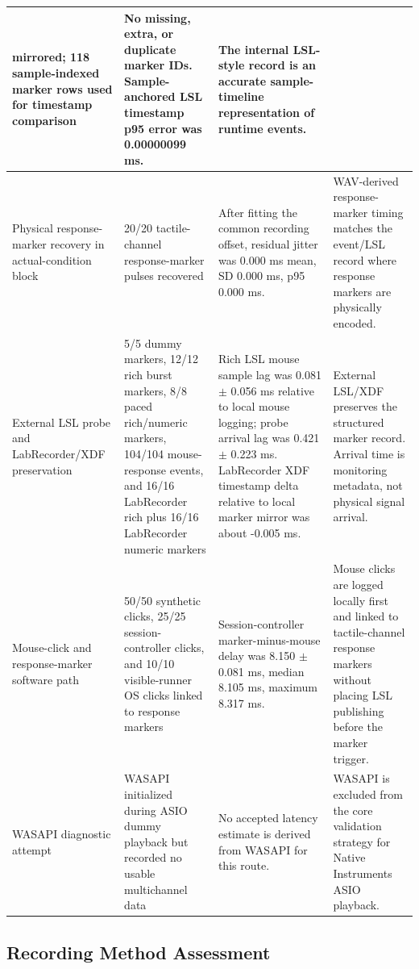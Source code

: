 \documentclass[11pt]{article}
\begin{document}
\begin{longtable}{|p{}|p{}|p{}|p{}|}
mirrored; 118 sample-indexed marker rows used for timestamp comparison & No
missing, extra, or duplicate marker IDs. Sample-anchored LSL timestamp p95 error
was 0.00000099 ms. & The internal LSL-style record is an accurate
sample-timeline representation of runtime events. \\
\hline
Physical response-marker recovery in actual-condition block & 20/20
tactile-channel response-marker pulses recovered & After fitting the common
recording offset, residual jitter was 0.000 ms mean, SD 0.000 ms, p95
0.000 ms. & WAV-derived response-marker timing matches the event/LSL record
where response markers are physically encoded. \\
\hline
External LSL probe and LabRecorder/XDF preservation & 5/5 dummy markers, 12/12
rich burst markers, 8/8 paced rich/numeric markers, 104/104 mouse-response
events, and 16/16 LabRecorder rich plus 16/16 LabRecorder numeric markers &
Rich LSL mouse sample lag was 0.081 $\pm$ 0.056 ms relative to local mouse
logging; probe arrival lag was 0.421 $\pm$ 0.223 ms. LabRecorder XDF timestamp
delta relative to local marker mirror was about -0.005 ms. & External LSL/XDF
preserves the structured marker record. Arrival time is monitoring metadata, not
physical signal arrival. \\
\hline
Mouse-click and response-marker software path & 50/50 synthetic clicks, 25/25
session-controller clicks, and 10/10 visible-runner OS clicks linked to response
markers & Session-controller marker-minus-mouse delay was 8.150 $\pm$ 0.081 ms,
median 8.105 ms, maximum 8.317 ms. & Mouse clicks are logged locally first and
linked to tactile-channel response markers without placing LSL publishing before
the marker trigger. \\
\hline
WASAPI diagnostic attempt & WASAPI initialized during ASIO dummy playback but
recorded no usable multichannel data & No accepted latency estimate is derived
from WASAPI for this route. & WASAPI is excluded from the core validation
strategy for Native Instruments ASIO playback. \\
\hline
\end{longtable}

\subsection{Recording Method Assessment}
\end{document}
